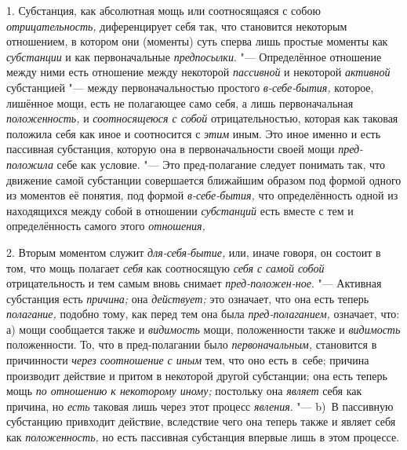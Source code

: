 1. Субстанция, как абсолютная мощь или соотносящаяся с собою {\em отрицательность,}
диференцирует себя так, что становится некоторым отношением,
в котором они (моменты) суть сперва лишь простые моменты как
{\em субстанции} и как первоначальные {\em предпосылки}. "---
Определённое отношение между ними есть отношение между некоторой {\em пассивной}
и некоторой {\em активной} субстанцией "--- между первоначальностью простого
{\em в-себе-бытия,} которое, лишённое мощи, есть не полагающее само себя,
а лишь первоначальная {\em положенность,} и {\em соотносящеюся с собой}
отрицательностью, которая как таковая положила себя как иное и соотносится с
{\em этим} иным. Это иное именно и есть пассивная субстанция, которую она в
первоначальности своей мощи {\em пред-положила} себе как условие. "--- Это
пред-полагание следует понимать так, что движение самой субстанции
совершается ближайшим образом под формой одного из моментов её понятия, под
формой {\em в-себе-бытия,} что определённость одной из находящихся между
собой в отношении {\em субстанций} есть вместе с тем и определённость самого
этого {\em отношения,}

2. Вторым моментом служит {\em для-себя-бытие,} или, иначе говоря, он
состоит в том, что мощь полагает {\em себя} как соотносящую {\em себя с
самой собой} отрицательность и тем самым вновь снимает
{\em пред-положен-ное}. "--- Активная субстанция есть {\em причина;} она
{\em действует;} это означает, что она есть теперь {\em полагание,} подобно
тому, как перед тем она была {\em пред-полаганием,} означает, что: а) мощи
сообщается также и {\em видимость} мощи, положенности также и {\em видимость}
положенности. То, что в пред-полагании было {\em первоначальным,} становится
в причинности {\em через соотношение с иным} тем, что оно есть в~себе;
причина производит действие и притом в некоторой другой субстанции; она есть
теперь мощь {\em по отношению к некоторому иному;} постольку она {\em являет}
себя как причина, но {\em есть} таковая лишь через этот процесс {\em явления}.
"--- b)~В пассивную субстанцию привходит действие, вследствие чего она теперь
также и являет себя как {\em положенность,} но есть пассивная субстанция
впервые лишь в этом процессе.

